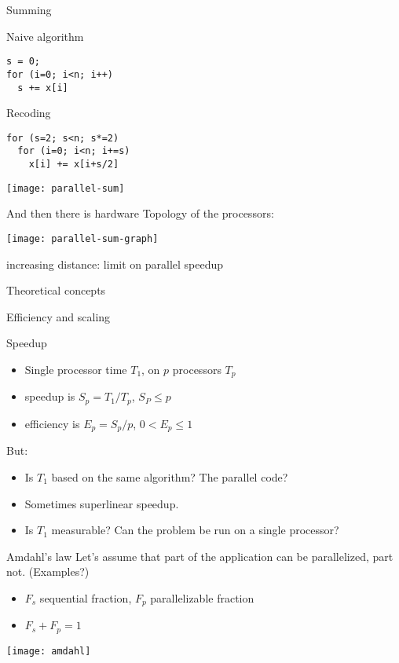 \begin{numberedframe}{Summing}
\begin{multicols}{2}
    Naive algorithm
\begin{lstlisting}
s = 0;
for (i=0; i<n; i++)
  s += x[i]
\end{lstlisting}
\columnbreak
Recoding
\begin{lstlisting}
for (s=2; s<n; s*=2)
  for (i=0; i<n; i+=s)
    x[i] += x[i+s/2]
\end{lstlisting}
\end{multicols}
  \texttt{[image: parallel-sum]}
\end{numberedframe}

\begin{numberedframe}{And then there is hardware}
  Topology of the processors:

  \texttt{[image: parallel-sum-graph]}

  increasing distance: limit on parallel speedup
\end{numberedframe}

 {Theoretical concepts}

 {Efficiency and scaling}

\begin{numberedframe}{Speedup}
  \begin{itemize}
  \item Single processor time $T_1$, on $p$ processors $T_p$
  \item speedup is $S_p=T_1/T_p$, $S_P\leq p$
  \item efficiency is $E_p=S_p/p$, $0< E_p\leq 1$
  \end{itemize}
  But:
\begin{itemize}
\item Is $T_1$ based on the same algorithm? The parallel code?
\item Sometimes superlinear speedup.
\item Is $T_1$ measurable? Can the problem be run on a single processor?
\end{itemize}
\end{numberedframe}

\begin{numberedframe}{Amdahl's law}
  Let's assume that part of the application can be parallelized, part not. (Examples?)
  \begin{itemize}
  \item $F_s$ sequential fraction, $F_p$ parallelizable fraction
  \item $F_s+F_p=1$
  \end{itemize}
  \texttt{[image: amdahl]}
\end{numberedframe}

